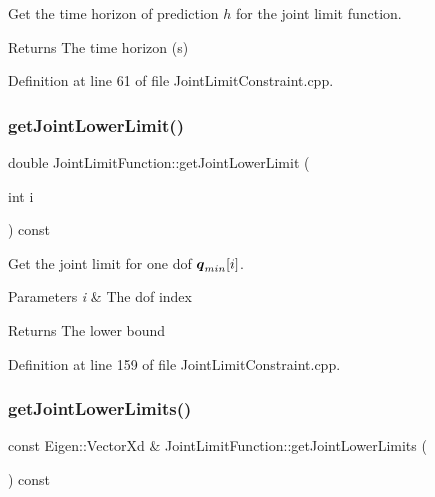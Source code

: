 Get the time horizon of prediction $ h $ for the joint limit function.

\begin{DoxyReturn}{Returns}
The time horizon (s) 
\end{DoxyReturn}


Definition at line 61 of file Joint\+Limit\+Constraint.\+cpp.

\hypertarget{classocra_1_1JointLimitFunction_aa5ad56143f8d257e89b308cabb5fd560}{}\label{classocra_1_1JointLimitFunction_aa5ad56143f8d257e89b308cabb5fd560} 
\subsubsection{\texorpdfstring{get\+Joint\+Lower\+Limit()}{getJointLowerLimit()}}
{\footnotesize\ttfamily double Joint\+Limit\+Function\+::get\+Joint\+Lower\+Limit (\begin{DoxyParamCaption}\item[{int}]{i }\end{DoxyParamCaption}) const}

Get the joint limit for one dof $ \mbox{\boldmath${q}$}_{min}[i] $.


\begin{DoxyParams}{Parameters}
{\em i} & The dof index \\
\hline
\end{DoxyParams}
\begin{DoxyReturn}{Returns}
The lower bound 
\end{DoxyReturn}


Definition at line 159 of file Joint\+Limit\+Constraint.\+cpp.

\hypertarget{classocra_1_1JointLimitFunction_ae9a3d083f00c608ed09a687447d086f1}{}\label{classocra_1_1JointLimitFunction_ae9a3d083f00c608ed09a687447d086f1} 
\subsubsection{\texorpdfstring{get\+Joint\+Lower\+Limits()}{getJointLowerLimits()}}
{\footnotesize\ttfamily const Eigen\+::\+Vector\+Xd \& Joint\+Limit\+Function\+::get\+Joint\+Lower\+Limits (\begin{DoxyParamCaption}{ }\end{DoxyParamCaption}) const}

